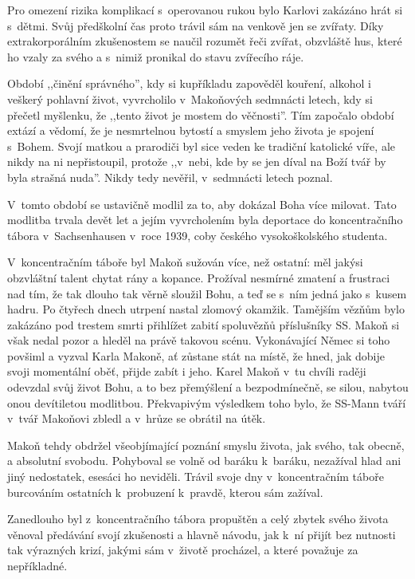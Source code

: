 Pro omezení rizika komplikací s~operovanou rukou bylo Karlovi zakázáno hrát si
s~dětmi. Svůj předškolní čas proto trávil sám na venkově jen se zvířaty. Díky
extrakorporálním zkušenostem se naučil rozumět řeči zvířat, obzvláště hus, které
ho vzaly za svého a s~nimiž pronikal do stavu zvířecího ráje.

Období ,,činění správného'', kdy si kupříkladu zapověděl kouření, alkohol i
veškerý pohlavní život, vyvrcholilo v~Makoňových sedmnácti letech, kdy si
přečetl myšlenku, že ,,tento život je mostem do věčnosti''. Tím započalo období
extází a vědomí, že je nesmrtelnou bytostí a smyslem jeho života je spojení
s~Bohem. Svojí matkou a prarodiči byl sice veden ke tradiční katolické víře, ale
nikdy na ni nepřistoupil, protože ,,v~nebi, kde by se jen díval na Boží tvář by
byla strašná nuda''. Nikdy tedy nevěřil, v~sedmnácti letech poznal.

V~tomto období se ustavičně modlil za to, aby dokázal Boha více milovat. Tato
modlitba trvala devět let a jejím vyvrcholením byla deportace do koncentračního
tábora v~Sachsenhausen v~roce 1939, coby českého vysokoškolského studenta.

V~koncentračním táboře byl Makoň sužován více, než ostatní: měl jakýsi
obzvláštní talent chytat rány a kopance. Prožíval nesmírné zmatení a frustraci
nad tím, že tak dlouho tak věrně sloužil Bohu, a teď se s~ním jedná jako s~kusem
hadru. Po čtyřech dnech utrpení nastal zlomový okamžik. Tamějším vězňům bylo
zakázáno pod trestem smrti přihlížet zabití spoluvězňů příslušníky SS. Makoň si
však nedal pozor a hleděl na právě takovou scénu. Vykonávající Němec si toho
povšiml a vyzval Karla Makoně, ať zůstane stát na místě, že hned, jak dobije
svoji momentální oběť, přijde zabít i jeho. Karel Makoň v~tu chvíli raději
odevzdal svůj život Bohu, a to bez přemýšlení a bezpodmínečně, se silou, nabytou
onou devítiletou modlitbou. Překvapivým výsledkem toho bylo, že SS-Mann tváří
v~tvář Makoňovi zbledl a v~hrůze se obrátil na útěk.

Makoň tehdy obdržel všeobjímající poznání smyslu života, jak svého, tak obecně,
a absolutní svobodu. Pohyboval se volně od baráku k~baráku, nezažíval hlad ani
jiný nedostatek, esesáci ho neviděli. Trávil svoje dny v~koncentračním táboře
burcováním ostatních k~probuzení k~pravdě, kterou sám zažíval.

Zanedlouho byl z~koncentračního tábora propuštěn a celý zbytek svého života
věnoval předávání svojí zkušenosti a hlavně návodu, jak k~ní přijít bez nutnosti
tak výrazných krizí, jakými sám v~životě procházel, a které považuje za
nepříkladné.

